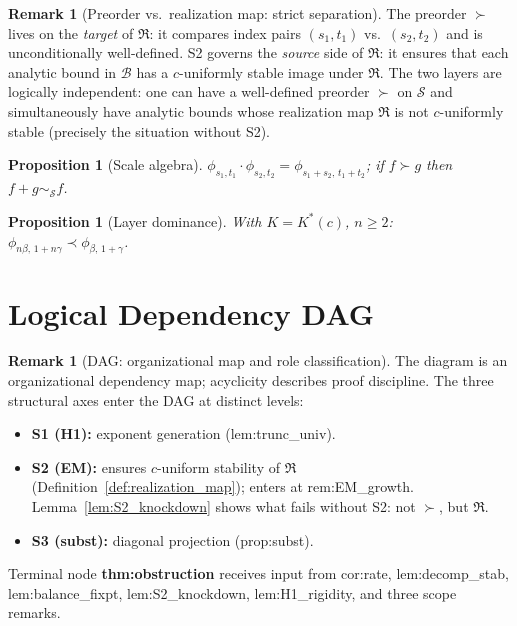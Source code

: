 \documentclass[12pt,a4paper]{amsart}
\newtheorem{proposition}[theorem]{Proposition}
\theoremstyle{definition}
\newtheorem{remark}[theorem]{Remark}
\begin{document}
\begin{remark}[Preorder vs.\ realization map: strict separation]
\label{rem:scale_admissibility}
The preorder $\succ$ lives on the \emph{target} of $\mathfrak{R}$:
it compares index pairs $(s_1,t_1)$ vs.\ $(s_2,t_2)$
and is unconditionally well-defined.
S2 governs the \emph{source} side of $\mathfrak{R}$:
it ensures that each analytic bound in $\mathcal{B}$ has a
$c$-uniformly stable image under $\mathfrak{R}$.
The two layers are logically independent:
one can have a well-defined preorder $\succ$ on $\mathcal{S}$
and simultaneously have analytic bounds whose realization map
$\mathfrak{R}$ is not $c$-uniformly stable
(precisely the situation without S2).
\end{remark}

\begin{proposition}[Scale algebra]
\label{prop:scale_algebra}
$\phi_{s_1,t_1}\cdot\phi_{s_2,t_2} = \phi_{s_1+s_2,\,t_1+t_2}$;
if $f\succ g$ then $f+g \sim_{\mathcal{S}} f$.
\end{proposition}

\begin{proposition}[Layer dominance]
\label{prop:asymp_order}
With $K=K^*(c)$, $n\geq 2$:
$\phi_{n\beta,\,1+n\gamma} \prec \phi_{\beta,\,1+\gamma}$.
\end{proposition}

\section{Logical Dependency DAG}
\label{sec:dag_logical}

\begin{remark}[DAG: organizational map and role classification]
\label{rem:dag_reading}
The diagram is an organizational dependency map; acyclicity describes
proof discipline.
The three structural axes enter the DAG at distinct levels:
\begin{itemize}[nosep]
  \item \textbf{S1 (H1):} exponent generation (lem:trunc\_univ).
  \item \textbf{S2 (EM):} ensures $c$-uniform stability of
    $\mathfrak{R}$ (Definition~\ref{def:realization_map});
    enters at rem:EM\_growth.
    Lemma~\ref{lem:S2_knockdown} shows what fails without S2:
    not $\succ$, but $\mathfrak{R}$.
  \item \textbf{S3 (subst):} diagonal projection (prop:subst).
\end{itemize}
Terminal node \textbf{thm:obstruction} receives input from
cor:rate, lem:decomp\_stab, lem:balance\_fixpt,
lem:S2\_knockdown, lem:H1\_rigidity, and three scope remarks.
\end{remark}
\end{document}
